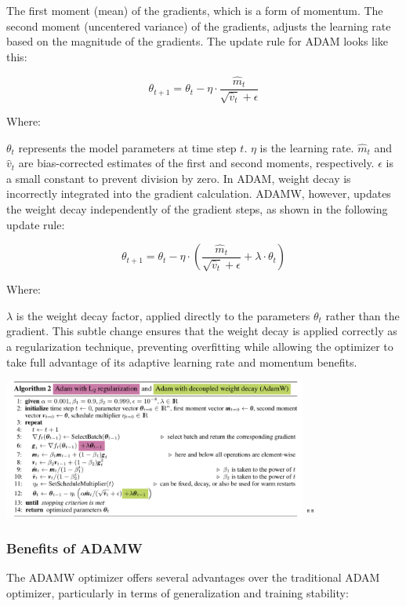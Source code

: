 The first moment (mean) of the gradients, which is a form of momentum.
The second moment (uncentered variance) of the gradients, adjusts the learning rate based on the magnitude of the gradients.
The update rule for ADAM looks like this:

\[\theta_{t+1} = \theta_t - \eta \cdot \frac{\hat{m}_t}{\sqrt{\hat{v}_t} + \epsilon}\]
 
Where:

$\theta_t$ represents the model parameters at time step $t$.
$\eta$ is the learning rate.
$\hat{m}_t$ and $\hat{v}_t$ are bias-corrected estimates of the first and second moments, respectively.
$\epsilon$ is a small constant to prevent division by zero.
In ADAM, weight decay is incorrectly integrated into the gradient calculation. ADAMW, however, updates the weight decay independently of the gradient steps, as shown in the following update rule:

\[\theta_{t+1} = \theta_t - \eta \cdot (\frac{\hat{m}_t}{\sqrt{\hat{v}_t} + \epsilon} + \lambda \cdot \theta_t)\]

Where:

$\lambda$ is the weight decay factor, applied directly to the parameters $\theta_t$ rather than the gradient.
This subtle change ensures that the weight decay is applied correctly as a regularization technique, preventing overfitting while allowing the optimizer to take full advantage of its adaptive learning rate and momentum benefits.

\begin{center}
    \includegraphics[width=0.75\textwidth]{images/ADAML2.jpg}
    "\cite{loshchilov2019decoupledweightdecayregularization}"
    \label{fig}
\end{center}

\subsubsection*{Benefits of ADAMW}

The ADAMW optimizer offers several advantages over the traditional ADAM optimizer, particularly in terms of generalization and training stability:

